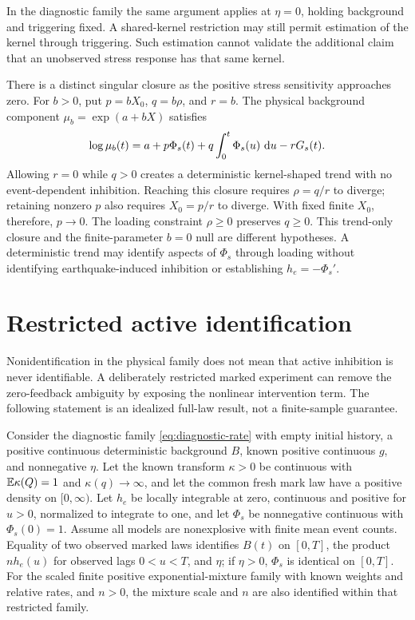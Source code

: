 In the diagnostic family the same argument applies at \(\eta=0\), holding background and triggering fixed. A shared-kernel restriction may still permit estimation of the kernel through triggering. Such estimation cannot validate the additional claim that an unobserved stress response has that same kernel.

There is a distinct singular closure as the positive stress sensitivity approaches zero. For \(b>0\), put \(p=bX_0\), \(q=b\rho\), and \(r=b\). The physical background component \(\mu_b=\exp(a+bX)\) satisfies
\[
\log\mu_b(t)=a+p\Phi_s(t)+q\int_0^t\Phi_s(u)\,\mathop{}\!\mathrm{d} u-rG_s(t).
\]
Allowing \(r=0\) while \(q>0\) creates a deterministic kernel-shaped trend with no event-dependent inhibition. Reaching this closure requires \(\rho=q/r\) to diverge; retaining nonzero \(p\) also requires \(X_0=p/r\) to diverge. With fixed finite \(X_0\), therefore, \(p\to0\). The loading constraint \(\rho\ge0\) preserves \(q\ge0\). This trend-only closure and the finite-parameter \(b=0\) null are different hypotheses. A deterministic trend may identify aspects of \(\Phi_s\) through loading without identifying earthquake-induced inhibition or establishing \(h_e=-\Phi_s'\).

\section{Restricted active identification}

Nonidentification in the physical family does not mean that active inhibition is never identifiable. A deliberately restricted marked experiment can remove the zero-feedback ambiguity by exposing the nonlinear intervention term. The following statement is an idealized full-law result, not a finite-sample guarantee.

\begin{proposition}
\label{prop:active_identification}
Consider the diagnostic family \eqref{eq:diagnostic-rate} with empty initial history, a positive continuous deterministic background \(B\), known positive continuous \(g\), and nonnegative \(\eta\). Let the known transform \(\kappa>0\) be continuous with \(\mathbb{E} \kappa(Q)=1\) and \(\kappa(q)\to\infty\), and let the common fresh mark law have a positive density on \([0,\infty)\). Let \(h_e\) be locally integrable at zero, continuous and positive for \(u>0\), normalized to integrate to one, and let \(\Phi_s\) be nonnegative continuous with \(\Phi_s(0)=1\). Assume all models are nonexplosive with finite mean event counts. Equality of two observed marked laws identifies \(B(t)\) on \([0,T]\), the product \(n h_e(u)\) for observed lags \(0<u<T\), and \(\eta\); if \(\eta>0\), \(\Phi_s\) is identical on \([0,T]\). For the scaled finite positive exponential-mixture family with known weights and relative rates, and \(n>0\), the mixture scale and \(n\) are also identified within that restricted family.
\end{proposition}

